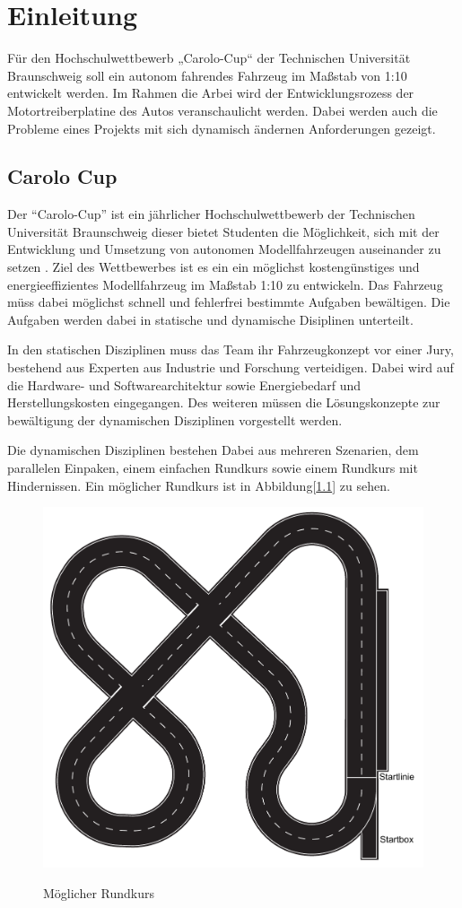 \chapter{Einleitung}

Für den Hochschulwettbewerb „Carolo-Cup“ der Technischen Universität Braunschweig soll ein autonom fahrendes Fahrzeug im Maßstab von 1:10
entwickelt werden. Im Rahmen die Arbei wird der Entwicklungsrozess der Motortreiberplatine des Autos veranschaulicht werden.
Dabei werden auch die Probleme eines Projekts mit sich dynamisch ändernen Anforderungen gezeigt. 


\section{Carolo Cup}
Der ``Carolo-Cup'' ist ein jährlicher Hochschulwettbewerb der Technischen Universität Braunschweig dieser bietet Studenten die Möglichkeit, sich mit der Entwicklung 
und Umsetzung von autonomen Modellfahrzeugen auseinander zu setzen \cite{website-carolo-cup}. Ziel des Wettbewerbes ist es ein ein möglichst kostengünstiges
und energieeffizientes Modellfahrzeug im Maßstab 1:10 zu entwickeln. Das Fahrzeug müss dabei möglichst schnell und fehlerfrei bestimmte Aufgaben
bewältigen. Die Aufgaben werden dabei in statische und dynamische Disiplinen unterteilt. 

In den statischen Disziplinen muss das Team ihr Fahrzeugkonzept vor einer Jury, bestehend aus Experten aus Industrie und Forschung verteidigen.
Dabei wird auf die Hardware- und Softwarearchitektur sowie Energiebedarf und Herstellungskosten eingegangen. Des weiteren müssen die Lösungskonzepte
zur bewältigung der dynamischen Disziplinen vorgestellt werden.

Die dynamischen Disziplinen bestehen Dabei aus mehreren Szenarien, dem parallelen Einpaken, einem einfachen Rundkurs sowie einem Rundkurs mit Hindernissen.
Ein möglicher Rundkurs ist in Abbildung[\ref{fig:Rundkurs}] zu sehen.

\begin{figure}[H]
\centering
\includegraphics[width=.8\textwidth]{Strecke.png}\\
\caption{Möglicher Rundkurs \cite{website-carolo-cup-regelwerk}}
\label{fig:Rundkurs}
\end{figure}

